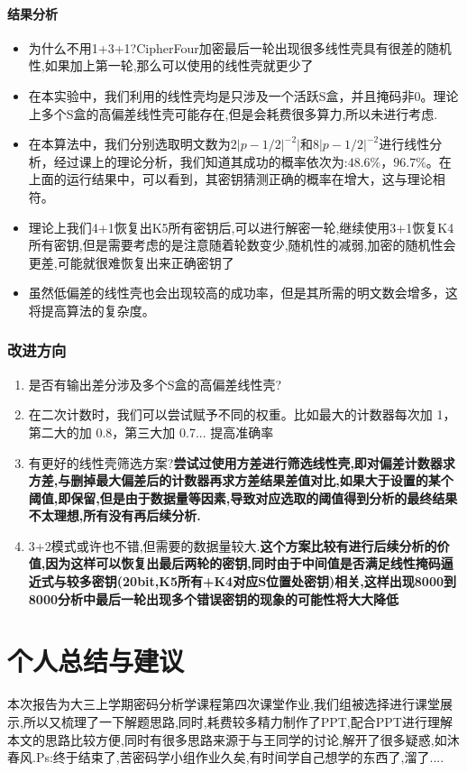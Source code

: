 \documentclass[UTF-8]{ctexart}
\begin{document}
\paragraph{结果分析} 
\begin{itemize}
	\item 为什么不用1+3+1?CipherFour加密最后一轮出现很多线性壳具有很差的随机性,如果加上第一轮,那么可以使用的线性壳就更少了
	\item 在本实验中，我们利用的线性壳均是只涉及一个活跃S盒，并且掩码非0。理论上多个S盒的高偏差线性壳可能存在,但是会耗费很多算力,所以未进行考虑.
	\item 在本算法中，我们分别选取明文数为$2|p-1/2|^{-2}|$和$8|p-1/2|^{-2}$进行线性分析，经过课上的理论分析，我们知道其成功的概率依次为:$48.6\%，96.7\%$。在上面的运行结果中，可以看到，其密钥猜测正确的概率在增大，这与理论相符。
	\item 理论上我们4+1恢复出K5所有密钥后,可以进行解密一轮,继续使用3+1恢复K4所有密钥,但是需要考虑的是注意随着轮数变少,随机性的减弱,加密的随机性会更差,可能就很难恢复出来正确密钥了
	\item 虽然低偏差的线性壳也会出现较高的成功率，但是其所需的明文数会增多，这将提高算法的复杂度。
\end{itemize}
\subsubsection{改进方向}
\begin{enumerate}
	\item 是否有输出差分涉及多个S盒的高偏差线性壳?
	\item 在二次计数时，我们可以尝试赋予不同的权重。比如最大的计数器每次加 1，第二大的加 0.8，第三大加 0.7... 提高准确率
	\item 有更好的线性壳筛选方案?\textbf{尝试过使用方差进行筛选线性壳,即对偏差计数器求方差,与删掉最大偏差后的计数器再求方差结果差值对比,如果大于设置的某个阈值,即保留,但是由于数据量等因素,导致对应选取的阈值得到分析的最终结果不太理想,所有没有再后续分析.}
	\item 3+2模式或许也不错,但需要的数据量较大.\textbf{这个方案比较有进行后续分析的价值,因为这样可以恢复出最后两轮的密钥,同时由于中间值是否满足线性掩码逼近式与较多密钥(20bit,K5所有+K4对应S位置处密钥)相关,这样出现8000到8000分析中最后一轮出现多个错误密钥的现象的可能性将大大降低} 	
\end{enumerate}
\section{个人总结与建议}
本次报告为大三上学期密码分析学课程第四次课堂作业,我们组被选择进行课堂展示,所以又梳理了一下解题思路,同时,耗费较多精力制作了PPT,配合PPT进行理解本文的思路比较方便,同时有很多思路来源于与王同学的讨论,解开了很多疑惑,如沐春风.Ps:终于结束了,苦密码学小组作业久矣,有时间学自己想学的东西了,溜了....
\end{document}
